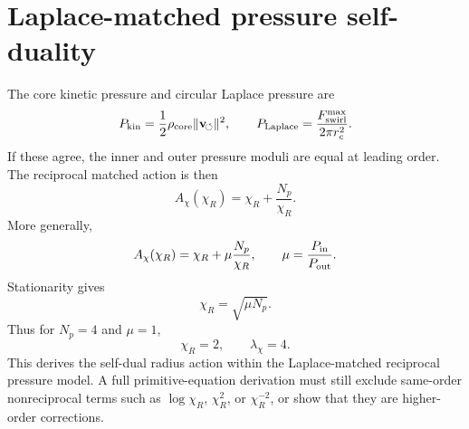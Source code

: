 \section{Laplace-matched pressure self-duality}
The core kinetic pressure and circular Laplace pressure are
\[
  P_{\rm kin}=\frac12\rho_{\rm core}
  \lVert\mathbf v_{\!\boldsymbol{\circlearrowleft}}\rVert^2,
  \qquad
  P_{\rm Laplace}=\frac{F_{\rm swirl}^{\max}}{2\pi r_c^2}.
\]
If these agree, the inner and outer pressure moduli are equal at leading order.
The reciprocal matched action is then
\[
  A_\chi(\chi_R)=\chi_R+\frac{N_p}{\chi_R}.
\]
More generally,
\[
  A_\chi(\chi_R)=\chi_R+\mu\frac{N_p}{\chi_R},
  \qquad
  \mu=\frac{P_{\rm in}}{P_{\rm out}}.
\]
Stationarity gives
\[
  \chi_R=\sqrt{\mu N_p}.
\]
Thus for \(N_p=4\) and \(\mu=1\),
\[
  \chi_R=2,\qquad \lambda_\chi=4.
\]
This derives the self-dual radius action within the Laplace-matched reciprocal
pressure model.  A full primitive-equation derivation must still exclude
same-order nonreciprocal terms such as \(\log\chi_R\), \(\chi_R^2\), or
\(\chi_R^{-2}\), or show that they are higher-order corrections.
